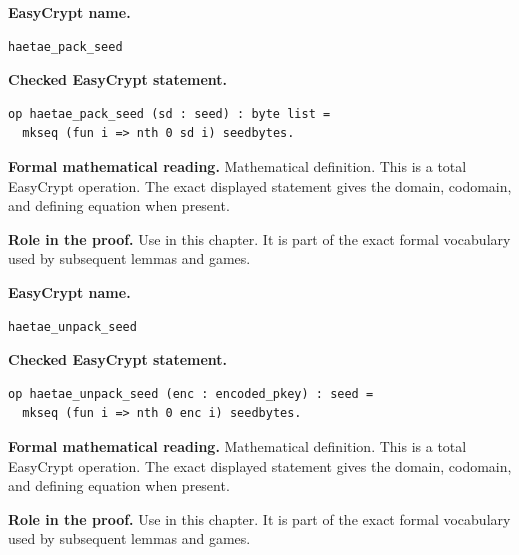 \begin{formaldefinition}
\noindent\textbf{EasyCrypt name.}
\begin{lstlisting}[language=EasyCrypt,basicstyle=\ttfamily\scriptsize]
haetae_pack_seed
\end{lstlisting}
\noindent\textbf{Checked EasyCrypt statement.}
\begin{lstlisting}[language=EasyCrypt,basicstyle=\ttfamily\scriptsize]
op haetae_pack_seed (sd : seed) : byte list =
  mkseq (fun i => nth 0 sd i) seedbytes.
\end{lstlisting}
\noindent\textbf{Formal mathematical reading.}
Mathematical definition. This is a total EasyCrypt operation.  The exact displayed statement gives the domain, codomain, and defining equation when present.

\noindent\textbf{Role in the proof.}
Use in this chapter. It is part of the exact formal vocabulary used by subsequent lemmas and games.

\end{formaldefinition}

\begin{formaldefinition}
\noindent\textbf{EasyCrypt name.}
\begin{lstlisting}[language=EasyCrypt,basicstyle=\ttfamily\scriptsize]
haetae_unpack_seed
\end{lstlisting}
\noindent\textbf{Checked EasyCrypt statement.}
\begin{lstlisting}[language=EasyCrypt,basicstyle=\ttfamily\scriptsize]
op haetae_unpack_seed (enc : encoded_pkey) : seed =
  mkseq (fun i => nth 0 enc i) seedbytes.
\end{lstlisting}
\noindent\textbf{Formal mathematical reading.}
Mathematical definition. This is a total EasyCrypt operation.  The exact displayed statement gives the domain, codomain, and defining equation when present.

\noindent\textbf{Role in the proof.}
Use in this chapter. It is part of the exact formal vocabulary used by subsequent lemmas and games.

\end{formaldefinition}

